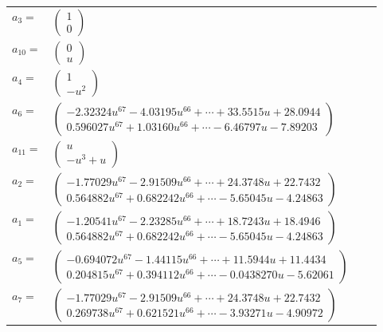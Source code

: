 \documentclass[1p]{elsarticle_modified}
\theoremstyle{definition}
\begin{document}
\begin{tabular}{m{7pt} m{180pt} m{7pt} m{180pt} }
\flushright $a_{3}=$&$\begin{pmatrix}1\\0\end{pmatrix}$ \\
\flushright $a_{10}=$&$\begin{pmatrix}0\\u\end{pmatrix}$ \\
\flushright $a_{4}=$&$\begin{pmatrix}1\\- u^2\end{pmatrix}$ \\
\flushright $a_{6}=$&$\begin{pmatrix}-2.32324 u^{67}-4.03195 u^{66}+\cdots+33.5515 u+28.0944\\0.596027 u^{67}+1.03160 u^{66}+\cdots-6.46797 u-7.89203\end{pmatrix}$ \\
\flushright $a_{11}=$&$\begin{pmatrix}u\\- u^3+u\end{pmatrix}$ \\
\flushright $a_{2}=$&$\begin{pmatrix}-1.77029 u^{67}-2.91509 u^{66}+\cdots+24.3748 u+22.7432\\0.564882 u^{67}+0.682242 u^{66}+\cdots-5.65045 u-4.24863\end{pmatrix}$ \\
\flushright $a_{1}=$&$\begin{pmatrix}-1.20541 u^{67}-2.23285 u^{66}+\cdots+18.7243 u+18.4946\\0.564882 u^{67}+0.682242 u^{66}+\cdots-5.65045 u-4.24863\end{pmatrix}$ \\
\flushright $a_{5}=$&$\begin{pmatrix}-0.694072 u^{67}-1.44115 u^{66}+\cdots+11.5944 u+11.4434\\0.204815 u^{67}+0.394112 u^{66}+\cdots-0.0438270 u-5.62061\end{pmatrix}$ \\
\flushright $a_{7}=$&$\begin{pmatrix}-1.77029 u^{67}-2.91509 u^{66}+\cdots+24.3748 u+22.7432\\0.269738 u^{67}+0.621521 u^{66}+\cdots-3.93271 u-4.90972\end{pmatrix}$ \\

\end{tabular}
\end{document}
